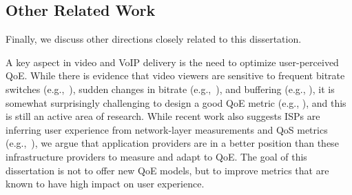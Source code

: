 




\subsection{Other Related Work}

Finally, we discuss other directions closely related to this dissertation.


A key aspect in  video  and VoIP delivery is the need to
optimize user-perceived  QoE. While there is evidence that
video viewers are sensitive to frequent bitrate switches 
(e.g.,~\cite{user-adaptive}), sudden
changes in bitrate (e.g.,~\cite{videoqoe}), and  buffering (e.g.,
\cite{sigcomm11}), it is somewhat surprisingly challenging 
to design a good QoE metric (e.g.,
\cite{qscore}), and this is still an active area of research.
While recent work also suggests ISPs are inferring  user 
experience from network-layer measurements and QoS metrics 
(e.g.,~\cite{mobicom2014-qos,sigmetrics2014-correlation,
aggarwal2014prometheus,
imc2012-firstbyte,sigcomm2010-mercury}), we argue that 
application providers are in a better position than these 
infrastructure providers to measure and adapt to QoE.
The goal of this dissertation is not to offer new QoE models, 
but to improve metrics that are known to have high impact 
on user experience.

